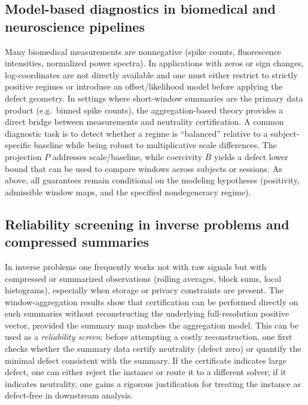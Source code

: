 \documentclass[11pt,reqno]{amsart}
\theoremstyle{definition}
\theoremstyle{remark}
\newcommand{\1}{\mathbf{1}}
\begin{document}
\subsection{Model-based diagnostics in biomedical and neuroscience pipelines}
Many biomedical measurements are nonnegative (spike counts, fluorescence intensities, normalized power spectra). In applications with zeros or sign changes, log-coordinates are not directly available and one must either restrict to strictly positive regimes or introduce an offset/likelihood model before applying the defect geometry.
In settings where short-window summaries are the primary data product (e.g.\ binned spike counts),
the aggregation-based theory provides a direct bridge between measurements and neutrality certification.
A common diagnostic task is to detect whether a regime is ``balanced'' relative to a subject-specific baseline
while being robust to multiplicative scale differences.
The projection $P$ addresses scale/baseline, while coercivity $B$ yields a defect lower bound that can be used to
compare windows across subjects or sessions.
As above, all guarantees remain conditional on the modeling hypotheses (positivity, admissible window maps,
and the specified nondegeneracy regime).

\subsection{Reliability screening in inverse problems and compressed summaries}
In inverse problems one frequently works not with raw signals but with compressed or summarized observations
(rolling averages, block sums, local histograms), especially when storage or privacy constraints are present.
The window-aggregation results show that certification can be performed directly on such summaries
without reconstructing the underlying full-resolution positive vector, provided the summary map matches the
aggregation model.
This can be used as a \emph{reliability screen}: before attempting a costly reconstruction,
one first checks whether the summary data certify neutrality (defect zero) or quantify the minimal defect
consistent with the summary.
If the certificate indicates large defect, one can either reject the instance or route it to a different solver;
if it indicates neutrality, one gains a rigorous justification for treating the instance as defect-free in downstream analysis.




\appendix
\label{app:RCL}
\end{document}
